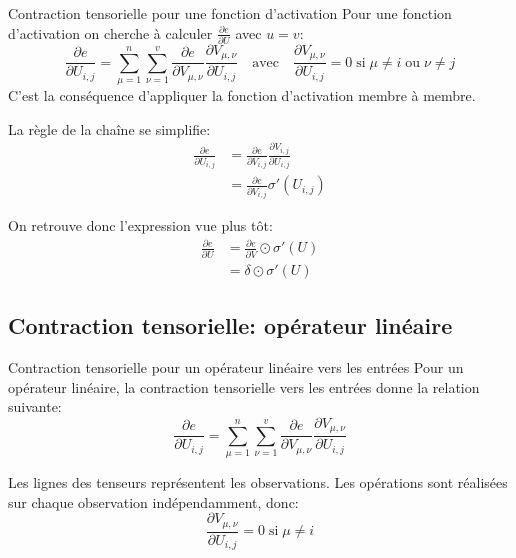 \begin{frame}{Contraction tensorielle pour une fonction d'activation}
	Pour une fonction d'activation on cherche à calculer $\frac{\partial{e}}{\partial{U}}$ avec $u = v$:
	\begin{equation*}
		\frac{\partial{e}}{\partial{U_{i,j}}} = \sum_{\mu=1}^n \sum_{\nu=1}^v \frac{\partial{e}}{\partial{V_{\mu,\nu}}} \frac{\partial{V_{\mu,\nu}}}{\partial{U_{i,j}}} \quad \text{avec} \quad \frac{\partial{V_{\mu,\nu}}}{\partial{U_{i,j}}} = 0 \; \text{si} \; \mu \ne i \; \text{ou} \; \nu \ne j
	\end{equation*}
	C'est la conséquence d'appliquer la fonction d'activation membre à membre. \\
	
	\pause
	
	La règle de la chaîne se simplifie:
	\begin{equation*}
		\begin{aligned}
			\frac{\partial{e}}{\partial{U_{i,j}}} 
			&= \frac{\partial{e}}{\partial{V_{i,j}}} \frac{\partial{V_{i,j}}}{\partial{U_{i,j}}} \\
			&= \frac{\partial{e}}{\partial{V_{i,j}}} \sigma'\left(U_{i,j}\right)
		\end{aligned}
	\end{equation*}
	
	\pause
	
	On retrouve donc l'expression vue plus tôt:
	\begin{equation*}
		\begin{aligned}
			\frac{\partial{e}}{\partial{U}} 
			&= \frac{\partial{e}}{\partial{V}} \odot \sigma'\left(U\right) \\
			&= \delta \odot \sigma'\left(U\right)
		\end{aligned}
	\end{equation*}
\end{frame}

\subsection{Contraction tensorielle: opérateur linéaire}

\begin{frame}{Contraction tensorielle pour un opérateur linéaire vers les entrées}
	Pour un opérateur linéaire, la contraction tensorielle vers les entrées donne la relation suivante:
	\begin{equation*}
		\frac{\partial{e}}{\partial{U_{i,j}}} = \sum_{\mu=1}^n \sum_{\nu=1}^v \frac{\partial{e}}{\partial{V_{\mu,\nu}}} \frac{\partial{V_{\mu,\nu}}}{\partial{U_{i,j}}}
	\end{equation*}
	
	\pause
	
	Les lignes des tenseurs représentent les observations. Les opérations sont réalisées sur chaque observation indépendamment, donc:
	\begin{equation*}
		\frac{\partial{V_{\mu,\nu}}}{\partial{U_{i,j}}} = 0 \; \text{si} \; \mu \ne i
	\end{equation*}
\end{frame}

